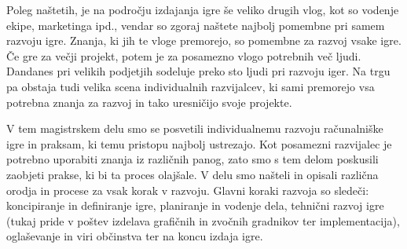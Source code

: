 \documentclass[12pt,a4paper,twoside]{book}
\begin{document}
Poleg naštetih, je na področju izdajanja igre še veliko drugih vlog, kot so vodenje ekipe, marketinga ipd., vendar so zgoraj naštete najbolj pomembne pri samem razvoju igre. Znanja, ki jih te vloge premorejo, so pomembne za razvoj vsake igre. Če gre za večji projekt, potem je za posamezno vlogo potrebnih več ljudi. Dandanes pri velikih podjetjih sodeluje preko sto ljudi pri razvoju iger. Na trgu pa obstaja tudi velika scena individualnih razvijalcev, ki sami premorejo vsa potrebna znanja za razvoj in tako uresničijo svoje projekte. 

V tem magistrskem delu smo se posvetili individualnemu razvoju računalniške igre in praksam, ki temu pristopu najbolj ustrezajo. Kot posamezni razvijalec je potrebno uporabiti znanja iz različnih panog, zato smo s tem delom poskusili zaobjeti prakse, ki bi ta proces olajšale. V delu smo našteli in opisali različna orodja in procese za vsak korak v razvoju. Glavni koraki razvoja so sledeči: koncipiranje in definiranje igre, planiranje in vodenje dela, tehnični razvoj igre (tukaj pride v poštev izdelava grafičnih in zvočnih gradnikov ter implementacija), oglaševanje in viri občinstva ter na koncu izdaja igre.
\end{document}
